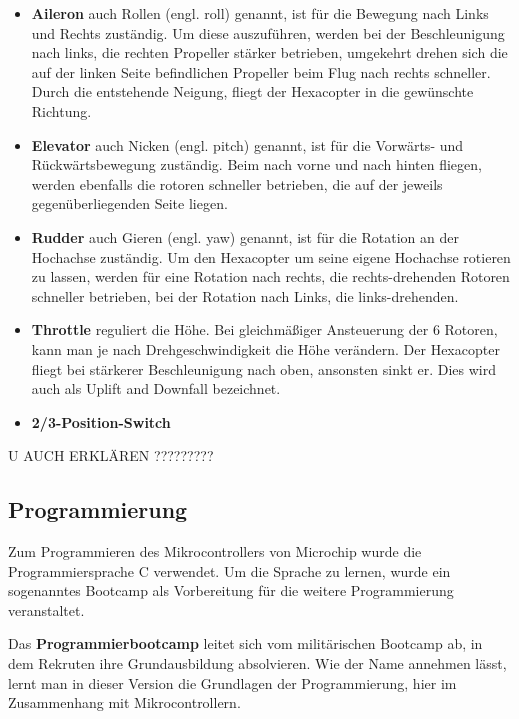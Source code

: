     \begin{itemize}
      \item \textbf{Aileron} auch Rollen (engl. roll) genannt, ist für die Bewegung nach Links und Rechts zuständig.
      Um diese auszuführen, werden bei der Beschleunigung nach links, die rechten Propeller stärker betrieben, umgekehrt drehen sich die auf der linken Seite befindlichen Propeller beim Flug nach rechts schneller. Durch die entstehende Neigung, fliegt der Hexacopter in die gewünschte Richtung.
      \item \textbf{Elevator} auch Nicken (engl. pitch) genannt, ist für die Vorwärts- und Rückwärtsbewegung zuständig.
      Beim nach vorne und nach hinten fliegen, werden ebenfalls die rotoren schneller betrieben, die auf der jeweils gegenüberliegenden Seite liegen. 
      \item \textbf{Rudder} auch Gieren (engl. yaw) genannt, ist für die Rotation an der Hochachse zuständig.
      Um den Hexacopter um seine eigene Hochachse rotieren zu lassen, werden für eine Rotation nach rechts, die rechts-drehenden Rotoren schneller betrieben, bei der Rotation nach Links, die links-drehenden.
      \item \textbf{Throttle} reguliert die Höhe.
      Bei gleichmäßiger Ansteuerung der 6 Rotoren, kann man je nach Drehgeschwindigkeit die Höhe verändern. Der Hexacopter fliegt bei stärkerer Beschleunigung nach oben, ansonsten sinkt er. Dies wird auch als Uplift and Downfall bezeichnet.
      \item \textbf{2/3-Position-Switch} 
    \end{itemize}


    U AUCH ERKLÄREN ?????????

 
  
  \subsection{Programmierung}
  Zum Programmieren des Mikrocontrollers von Microchip wurde die Programmiersprache C verwendet.
  Um die Sprache zu lernen, wurde ein sogenanntes Bootcamp als Vorbereitung für die weitere Programmierung veranstaltet.

  Das \textbf{Programmierbootcamp} leitet sich vom militärischen Bootcamp ab, in dem Rekruten ihre Grundausbildung absolvieren. Wie der Name annehmen lässt, lernt man in dieser Version die Grundlagen der Programmierung, hier im Zusammenhang mit Mikrocontrollern. 

